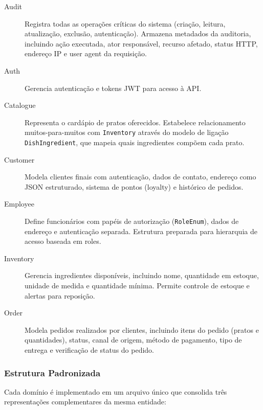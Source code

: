 \begin{description}
  \item[Audit] Registra todas as operações críticas do sistema (criação, leitura, atualização, exclusão, autenticação).
  Armazena metadados da auditoria, incluindo ação executada, ator responsável, recurso afetado, status HTTP, endereço IP e user agent da requisição.

  \item[Auth] Gerencia autenticação e tokens JWT para acesso à API.

  \item[Catalogue] Representa o cardápio de pratos oferecidos. Estabelece relacionamento muitos-para-muitos com \texttt{Inventory}
  através do modelo de ligação \texttt{DishIngredient}, que mapeia quais ingredientes compõem cada prato.

  \item[Customer] Modela clientes finais com autenticação, dados de contato, endereço como JSON estruturado,
  sistema de pontos (loyalty) e histórico de pedidos.

  \item[Employee] Define funcionários com papéis de autorização (\texttt{RoleEnum}), dados de endereço e autenticação separada.
  Estrutura preparada para hierarquia de acesso baseada em roles.

  \item[Inventory] Gerencia ingredientes disponíveis, incluindo nome, quantidade em estoque, unidade de medida e quantidade mínima.
  Permite controle de estoque e alertas para reposição.

  \item[Order] Modela pedidos realizados por clientes, incluindo itens do pedido (pratos e quantidades), status, canal de origem,
  método de pagamento, tipo de entrega e verificação de status do pedido.
\end{description}

\subsubsection{Estrutura Padronizada}

\hspace{0.5cm} Cada domínio é implementado em um arquivo único que consolida três representações complementares da mesma entidade:

